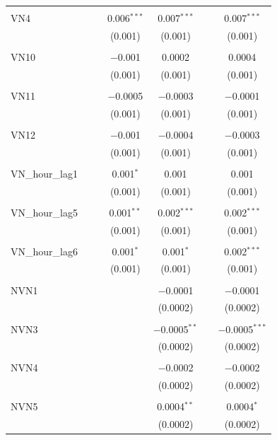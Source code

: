 \begin{table}[!htbp]
\begin{tabular}{@{\extracolsep{5pt}}lcccccc}
  & & & & & & \\ 
 VN4 &  &  & 0.006$^{***}$ & 0.007$^{***}$ &  & 0.007$^{***}$ \\ 
  &  &  & (0.001) & (0.001) &  & (0.001) \\ 
  & & & & & & \\ 
 VN10 &  &  & $-$0.001 & 0.0002 &  & 0.0004 \\ 
  &  &  & (0.001) & (0.001) &  & (0.001) \\ 
  & & & & & & \\ 
 VN11 &  &  & $-$0.0005 & $-$0.0003 &  & $-$0.0001 \\ 
  &  &  & (0.001) & (0.001) &  & (0.001) \\ 
  & & & & & & \\ 
 VN12 &  &  & $-$0.001 & $-$0.0004 &  & $-$0.0003 \\ 
  &  &  & (0.001) & (0.001) &  & (0.001) \\ 
  & & & & & & \\ 
 VN\_hour\_lag1 &  &  & 0.001$^{*}$ & 0.001 &  & 0.001 \\ 
  &  &  & (0.001) & (0.001) &  & (0.001) \\ 
  & & & & & & \\ 
 VN\_hour\_lag5 &  &  & 0.001$^{**}$ & 0.002$^{***}$ &  & 0.002$^{***}$ \\ 
  &  &  & (0.001) & (0.001) &  & (0.001) \\ 
  & & & & & & \\ 
 VN\_hour\_lag6 &  &  & 0.001$^{*}$ & 0.001$^{*}$ &  & 0.002$^{***}$ \\ 
  &  &  & (0.001) & (0.001) &  & (0.001) \\ 
  & & & & & & \\ 
 NVN1 &  &  &  & $-$0.0001 &  & $-$0.0001 \\ 
  &  &  &  & (0.0002) &  & (0.0002) \\ 
  & & & & & & \\ 
 NVN3 &  &  &  & $-$0.0005$^{**}$ &  & $-$0.0005$^{***}$ \\ 
  &  &  &  & (0.0002) &  & (0.0002) \\ 
  & & & & & & \\ 
 NVN4 &  &  &  & $-$0.0002 &  & $-$0.0002 \\ 
  &  &  &  & (0.0002) &  & (0.0002) \\ 
  & & & & & & \\ 
 NVN5 &  &  &  & 0.0004$^{**}$ &  & 0.0004$^{*}$ \\ 
  &  &  &  & (0.0002) &  & (0.0002) \\ 

\end{tabular}
\end{table}
